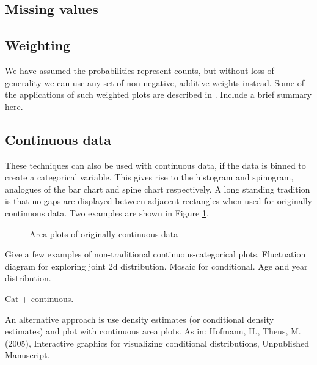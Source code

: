 \documentclass[letterpaper,oneside]{scrartcl}
\begin{document}
% 


\subsection{Missing values}
\label{sub:missing_values}


\subsection{Weighting}
\label{sub:weighting}

We have assumed the probabilities represent counts, but without loss of generality we can use any set of non-negative, additive weights instead.  Some of the applications of such weighted plots are described in \citet{unwin:2007}.  Include a brief summary here.

\subsection{Continuous data}
\label{sub:continuous_data}

These techniques can also be used with continuous data, if the data is binned to create a categorical variable. This gives rise to the histogram and spinogram, analogues of the bar chart and spine chart respectively. A long standing tradition is that no gaps are displayed between adjacent rectangles when used for originally continuous data. Two examples are shown in Figure \ref{fig:cont-examples}.

\begin{figure}[htbp]
  \begin{center}
  \end{center}
  \caption{Area plots of originally continuous data}
  \label{fig:cont-examples}
\end{figure}

Give a few examples of non-traditional continuous-categorical plots.  Fluctuation diagram for exploring joint 2d distribution.  Mosaic for conditional.  Age and year distribution.  

Cat + continuous.

An alternative approach is use density estimates (or conditional density estimates) and plot with continuous area plots.  As in: Hofmann, H., Theus, M. (2005), Interactive graphics for visualizing conditional distributions, Unpublished Manuscript.
\end{document}
